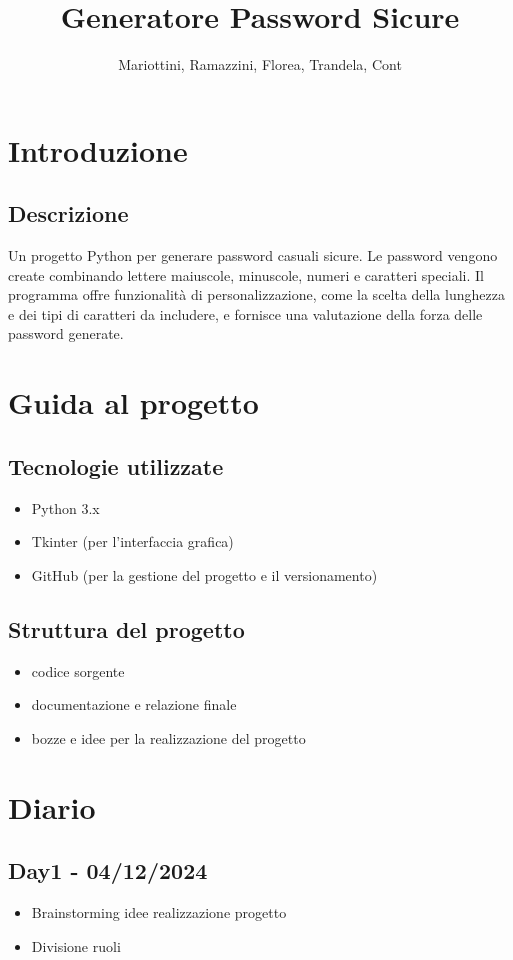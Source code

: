 \documentclass[twocolumn]{article}
\title{Generatore Password Sicure}
\author{Mariottini, Ramazzini, Florea, Trandela, Cont}
\date{}
\begin{document}
\maketitle

\section{Introduzione}

    \subsection{Descrizione}

        Un progetto Python per generare password casuali sicure. Le password vengono create combinando lettere maiuscole, minuscole, numeri e caratteri speciali. Il programma offre funzionalità di personalizzazione, come la scelta della lunghezza e dei tipi di caratteri da includere, e fornisce una valutazione della forza delle password generate.

\section{Guida al progetto}

    \subsection{Tecnologie utilizzate}

        \begin{itemize}            
            \item Python 3.x
            \item Tkinter (per l'interfaccia grafica)
            \item GitHub (per la gestione del progetto e il versionamento)
        \end{itemize}

    \subsection{Struttura del progetto}

        \begin{itemize}
            \item {} codice sorgente
            \item {} documentazione e relazione finale
            \item {} bozze e idee per la realizzazione del progetto
        \end{itemize}

\section{Diario}

    \subsection{Day1 - 04/12/2024}
        \begin{itemize}
            \item Brainstorming idee realizzazione progetto
            \item Divisione ruoli
        \end{itemize}
\end{document}
